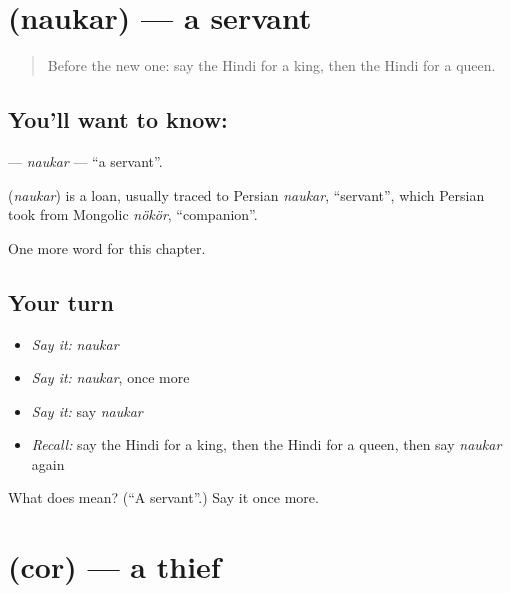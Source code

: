 \section[\texorpdfstring{\hi{नौकर} (naukar)}{नौकर (naukar)}]{ (naukar) — a servant}

\label{lesson:HI-C196-naukar}



\begin{quote}
Before the new one: say the Hindi for a king, then the Hindi for a queen.
\end{quote}

\subsection*{You'll want to know: }
\textbf{} — \emph{naukar} — \textquotedblleft{}a servant\textquotedblright{}.

\begin{cousinweb}
\textbf{} (\emph{naukar}) is a loan, usually traced to Persian \emph{naukar}, \textquotedblleft{}servant\textquotedblright{}, which Persian took from Mongolic \emph{nökör}, \textquotedblleft{}companion\textquotedblright{}.
\end{cousinweb}

\begin{grammarlens}[title={What you've built}]
One more word for this chapter.
\end{grammarlens}

\subsection*{Your turn}
\begin{itemize}
\raggedright
  \item \emph{Say it:} \emph{naukar}
  \item \emph{Say it:} \emph{naukar}, once more
  \item \emph{Say it:} say \emph{naukar}
  \item \emph{Recall:} say the Hindi for a king, then the Hindi for a queen, then say \emph{naukar} again
\end{itemize}

\begin{tcolorbox}[breakable,colback=teal!4,colframe=teal!35!black,title={Before you move on}]
What does  mean? (\textquotedblleft{}A servant\textquotedblright{}.) Say it once more.
\end{tcolorbox}
\section[\texorpdfstring{\hi{चोर} (cor)}{चोर (cor)}]{ (cor) — a thief}

